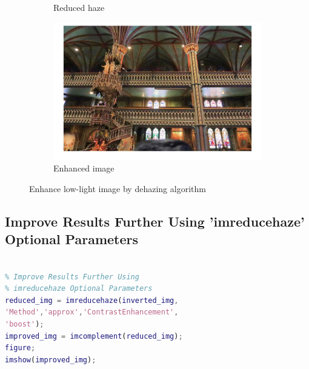 \documentclass[conference]{IEEEtran}
\begin{document}
\begin{figure}[h!]
\begin{subfigure}[b]{0.4\linewidth}
\caption{Reduced haze}
\end{subfigure}
\begin{subfigure}[b]{0.4\linewidth}
\includegraphics[width=\linewidth]{images/img24.jpg}
\caption{Enhanced image}
\end{subfigure}
\caption{Enhance low-light image by dehazing algorithm}
\label{fig:Enhance low-light image by dehazing algorithm}
\end{figure}

\subsection{Improve Results Further Using 'imreducehaze' Optional Parameters}

\begin{lstlisting}[language=Matlab]

% Improve Results Further Using 
% imreducehaze Optional Parameters
reduced_img = imreducehaze(inverted_img, 
'Method','approx','ContrastEnhancement',
'boost');
improved_img = imcomplement(reduced_img);
figure;
imshow(improved_img);

\end{lstlisting}
\end{document}
